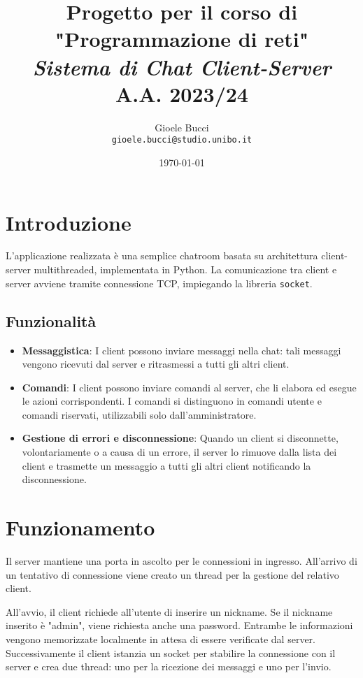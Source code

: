 \documentclass[a4paper,12pt]{report}
\title{\textbf{Progetto per il corso di\\"Programmazione di reti"}
\\\textit{Sistema di Chat Client-Server}
\\A.A. 2023/24}
\author{Gioele Bucci
\\ \texttt{gioele.bucci@studio.unibo.it}}
\date{\today}
\begin{document}
\maketitle

\section{Introduzione}

L'applicazione realizzata è una semplice chatroom basata su architettura client-server multithreaded, implementata in Python. La comunicazione tra client e server avviene tramite connessione TCP, impiegando la libreria \verb|socket|. \par

\subsection{Funzionalità}

\begin{itemize}
    \item \textbf{Messaggistica}: I client possono inviare messaggi nella chat: tali messaggi vengono ricevuti dal server e ritrasmessi a tutti gli altri client.

    \item \textbf{Comandi}: I client possono inviare comandi al server, che li elabora ed esegue le azioni corrispondenti. I comandi si distinguono in comandi utente e comandi riservati, utilizzabili solo dall'amministratore.

    \item \textbf{Gestione di errori e disconnessione}: Quando un client si disconnette, volontariamente o a causa di un errore, il server lo rimuove dalla lista dei client e trasmette un messaggio a tutti gli altri client notificando la disconnessione.

\end{itemize}

\section{Funzionamento}

Il server mantiene una porta in ascolto per le connessioni in ingresso. All'arrivo di un tentativo di connessione viene creato un thread per la gestione del relativo client.  \par

All'avvio, il client richiede all'utente di inserire un nickname. Se il nickname inserito è "admin", viene richiesta anche una password. Entrambe le informazioni vengono memorizzate localmente in attesa di essere verificate dal server. 
Successivamente il client istanzia un socket per stabilire la connessione con il server e crea due thread: uno per la ricezione dei messaggi e uno per l'invio.
\end{document}
